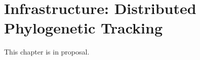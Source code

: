 \chapter{Infrastructure: Distributed Phylogenetic Tracking}
\label{ch:distributed-phylogeny}

\noindent
This chapter is in proposal.
